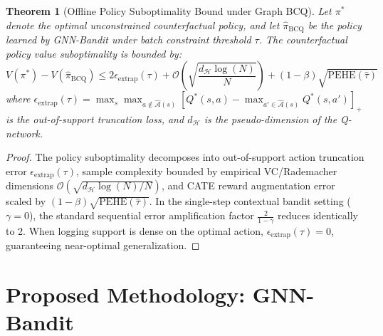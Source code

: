 \documentclass[preprint,12pt,3p]{elsarticle}
\newtheorem{theorem}{Theorem}
\begin{document}
\begin{theorem}[Offline Policy Suboptimality Bound under Graph BCQ]
\label{thm:bcq_subopt}
Let $\pi^*$ denote the optimal unconstrained counterfactual policy, and let $\hat{\pi}_{\mathrm{BCQ}}$ be the policy learned by GNN-Bandit under batch constraint threshold $\tau$. The counterfactual policy value suboptimality is bounded by:
\begin{equation}
V(\pi^*) - V(\hat{\pi}_{\mathrm{BCQ}}) \le 2 \epsilon_{\mathrm{extrap}}(\tau) + \mathcal{O}\left( \sqrt{\frac{d_{\mathcal{H}} \log(N)}{N}} \right) + (1 - \beta) \sqrt{\mathrm{PEHE}(\hat{\tau})}
\end{equation}
where $\epsilon_{\mathrm{extrap}}(\tau) = \max_{s} \max_{a \notin \hat{\mathcal{A}}(s)} [Q^*(s, a) - \max_{a' \in \hat{\mathcal{A}}(s)} Q^*(s, a')]_+$ is the out-of-support truncation loss, and $d_{\mathcal{H}}$ is the pseudo-dimension of the Q-network.
\end{theorem}
\begin{proof}
The policy suboptimality decomposes into out-of-support action truncation error $\epsilon_{\mathrm{extrap}}(\tau)$, sample complexity bounded by empirical VC/Rademacher dimensions $\mathcal{O}(\sqrt{d_{\mathcal{H}} \log(N)/N})$, and CATE reward augmentation error scaled by $(1 - \beta)\sqrt{\mathrm{PEHE}(\hat{\tau})}$. In the single-step contextual bandit setting ($\gamma = 0$), the standard sequential error amplification factor $\frac{2}{1 - \gamma}$ reduces identically to 2. When logging support is dense on the optimal action, $\epsilon_{\mathrm{extrap}}(\tau) = 0$, guaranteeing near-optimal generalization.
\end{proof}


\section{Proposed Methodology: GNN-Bandit}
\label{sec:method}
\end{document}
